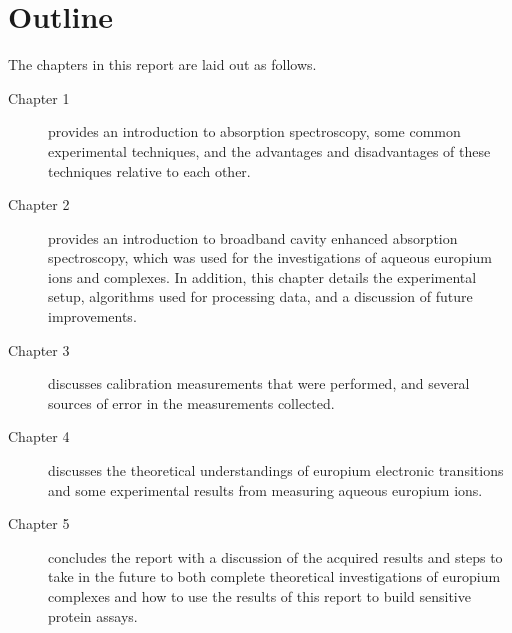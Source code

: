 \section*{Outline}

The chapters in this report are laid out as follows.

\begin{description}
  \item[Chapter 1] provides an introduction to absorption spectroscopy, some
    common experimental techniques, and the advantages and disadvantages of
    these techniques relative to each other.
  \item[Chapter 2] provides an introduction to broadband cavity enhanced
    absorption spectroscopy, which was used for the investigations of aqueous
    europium ions and complexes. In addition, this chapter details the
    experimental setup, algorithms used for processing data, and a discussion
    of future improvements.
  \item[Chapter 3] discusses calibration measurements that were performed, and
    several sources of error in the measurements collected.
  \item[Chapter 4] discusses the theoretical understandings of europium
    electronic transitions and some experimental results from measuring
    aqueous europium ions.
  \item[Chapter 5] concludes the report with a discussion of the acquired
    results and steps to take in the future to both complete theoretical
    investigations of europium complexes and how to use the results of
    this report to build sensitive protein assays.
\end{description}
